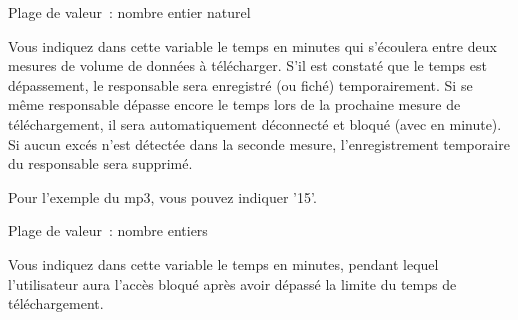 \begin{description}


   Plage de valeur~: nombre entier naturel

   Vous indiquez dans cette variable le temps en minutes qui s'écoulera entre deux mesures de volume de données
   à télécharger. S'il est constaté que le temps est dépassement, le responsable sera enregistré (ou fiché)
   temporairement. Si se même responsable dépasse encore le temps lors de la prochaine mesure de téléchargement,
   il sera automatiquement déconnecté et bloqué (avec  en minute).
   Si aucun excés n'est détectée dans la seconde mesure, l'enregistrement temporaire du responsable sera supprimé.

   Pour l'exemple du mp3, vous pouvez indiquer '15'.



   Plage de valeur~: nombre entiers

   Vous indiquez dans cette variable le temps en minutes, pendant lequel l'utilisateur aura l'accès bloqué
   après avoir dépassé la limite du temps de téléchargement.

\end{description}